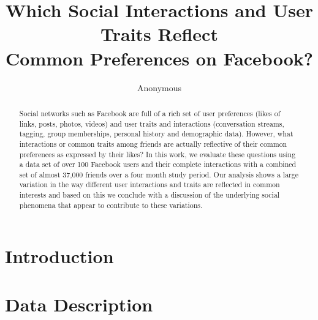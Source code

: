 \documentclass[letterpaper]{article}
\begin{document}
%
\title{Which Social Interactions and User Traits Reflect \\Common Preferences on Facebook?}
\author{Anonymous}

\maketitle
\begin{abstract}
Social networks such as Facebook are full of a rich set of user preferences (likes of links, posts, photos, videos) and user traits and interactions (conversation streams, tagging, group memberships, personal history and demographic data). However, what interactions or common traits among friends are actually reflective of their common preferences as expressed by their likes? In this work, we evaluate these questions using a data set of over 100 Facebook users and their complete interactions with a combined set of almost 37,000 friends over a four month study period. Our analysis shows a large variation in the way different user interactions and traits are reflected in common interests and based on this we conclude with a discussion of the underlying social phenomena that appear to contribute to these variations.
\end{abstract}


\section{Introduction}



\section{Data Description}
\end{document}
